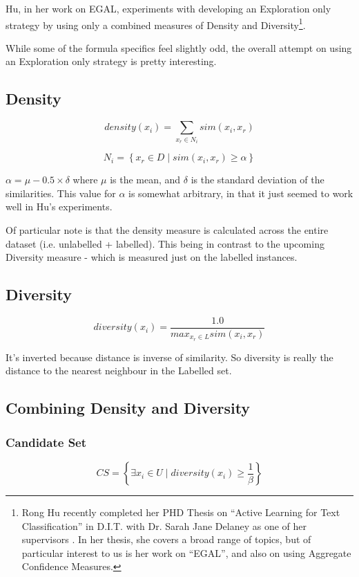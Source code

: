 \documentclass[a4paper,11pt]{report}
\begin{document}
Hu, in her work on EGAL, experiments with developing an Exploration only strategy by using only a combined measures of Density and Diversity\footnote{Rong Hu recently completed her PHD Thesis on ``Active Learning for Text Classification'' in D.I.T. with Dr. Sarah Jane Delaney as one of her supervisors \cite{Hu2011}. In her thesis, she covers a broad range of topics, but of particular interest to us is her work on ``EGAL'', and also on using Aggregate Confidence Measures.}.

While some of the formula specifics feel slightly odd, the overall attempt on using an Exploration only strategy is pretty interesting. 


\subsection{Density}
\[
density(x_{i})=\underset{x_{r}\in N_{i}}{\sum}sim(x_{i},x_{r})
\]

\[
N_{i}=\left\{ x_{r}\in D\mid sim(x_{i},x_{r})\geq\alpha\right\} 
\]

$\alpha=\mu-0.5\times\delta$ where $\mu$ is the mean, and $\delta$ is the standard deviation of the similarities. This value for $\alpha$ is somewhat arbitrary, in that it just seemed to work well in Hu's experiments.

Of particular note is that the density measure is calculated across the entire dataset (i.e. unlabelled + labelled). This being in contrast to the upcoming Diversity measure - which is measured just on the labelled instances.

\subsection{Diversity}

\[
diversity(x_{i})=\frac{1.0}{max_{x_{r}\in L}sim(x_{i},x_{r})}
\]

It's inverted because distance is inverse of similarity. So diversity is really the distance to the nearest neighbour in the Labelled set.

\subsection{Combining Density and Diversity}

\subsubsection{Candidate Set}
\[
CS=\left\{ \exists x_{i}\in U\mid diversity(x_{i})\geq\frac{1}{\beta}\right\} 
\]
\end{document}
